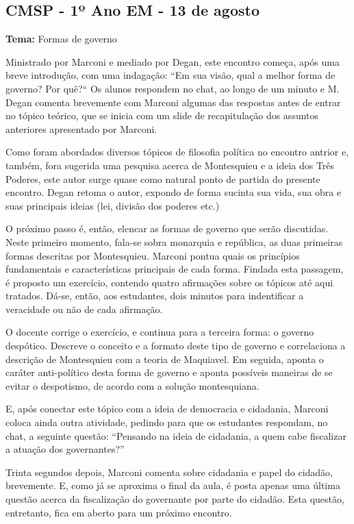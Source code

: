 \documentclass[12pt,a4paper]{article}
\begin{document}
	\subsection{CMSP - 1º Ano EM - 13 de agosto}

	\textbf{Tema:} Formas de governo

	Ministrado por Marconi e mediado por Degan, este encontro começa, 
	após uma breve introdução, com uma indagação: “Em sua visão, qual a 
	melhor forma de governo? Por quê?“ Os alunos respondem no chat, 
	ao longo de um minuto e M. Degan comenta brevemente com Marconi algumas 
	das respostas antes de entrar no tópico teórico, que se inicia com 
	um slide de recapitulação dos assuntos anteriores apresentado por 
	Marconi. 

	Como foram abordados diversos tópicos de filosofia política no 
	encontro antrior e, também, fora sugerida uma pesquisa acerca de 
	Montesquieu e a ideia dos Três Poderes, este autor surge quase 
	como natural ponto de partida do presente encontro. Degan retoma 
	o autor, expondo de forma sucinta sua vida, sua obra e suas 
	principais ideias (lei, divisão dos poderes etc.) 

	O próximo passo é, então, elencar as formas de governo que serão 
	discutidas. Neste primeiro momento, fala-se sobra monarquia e 
	república, as duas primeiras formas descritas por Montesquieu. 
	Marconi pontua quais os princípios fundamentais e 
	características principais de cada forma. Findada esta passagem, 
	é proposto um exercício, contendo quatro afirmações sobre os 
	tópicos até aqui tratados. Dá-se, então, aos estudantes, dois 
	minutos para indentificar a veracidade ou não de cada afirmação. 

	O docente corrige o exercício, e continua para a terceira forma: 
	o governo despótico. Descreve o conceito e a formato deste tipo 
	de governo e correlaciona a descrição de Montesquieu com a teoria 
	de Maquiavel. Em seguida, aponta o caráter anti-político desta 
	forma de governo e aponta possíveis maneiras de se evitar o 
	despotismo, de acordo com a solução montesquiana. 

	E, após conectar este tópico com a ideia de democracia e cidadania, 
	Marconi coloca ainda outra atividade, pedindo para que os estudantes 
	respondam, no chat, a seguinte questão: “Pensando na ideia de 
	cidadania, a quem cabe fiscalizar a atuação dos governantes?” 

	Trinta segundos depois, Marconi comenta sobre cidadania e papel 
	do cidadão, brevemente. E, como já se aproxima o final da aula, 
	é posta apenas uma última questão acerca da fiscalização do 
	governante por parte do cidadão. Esta questão, entretanto, fica 
	em aberto para um próximo encontro. 
\end{document}

